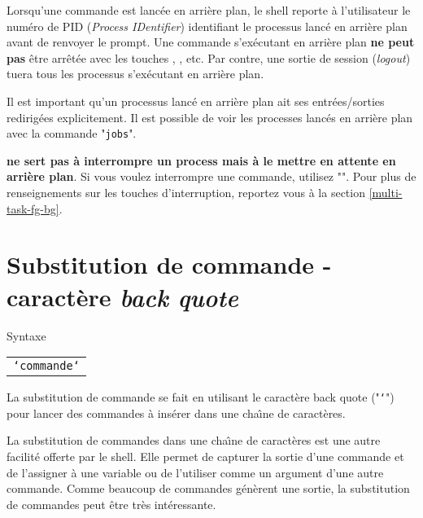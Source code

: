 Lorsqu'une commande est lanc{\'e}e en arri{\`e}re plan, le shell reporte
{\`a} l'utilisateur le num{\'e}ro de PID ({\sl Process IDentifier}) identifiant le processus
lanc{\'e} en arri{\`e}re plan avant de renvoyer le prompt. Une commande
s'ex{\'e}cutant en arri{\`e}re plan \textbf{ne peut pas} {\^e}tre
arr{\^e}t{\'e}e avec les touches , , etc.
Par contre, une sortie de session (\textsl{logout}) tuera tous les
processus s'ex{\'e}cutant en arri{\`e}re plan.

Il est important qu'un processus lanc{\'e} en arri{\`e}re plan ait ses
entr{\'e}es/sorties redirig{\'e}es explicitement. Il est possible de
voir les processes lanc{\'e}s en arri{\`e}re plan avec la commande
 "\texttt{jobs}".

\begin{remarque}
 {\bf ne sert pas {\`a} interrompre un process mais {\`a} le mettre
en attente en arri{\`e}re plan}. Si vous voulez interrompre une commande,
utilisez "". Pour plus de renseignements sur les touches
d'interruption, reportez vous {\`a} la section \ref{multi-task-fg-bg}.
\end{remarque}

\section{\label{multi-task-backq}Substitution de commande - caract{\`e}re {\sl back quote}}

\begin{definition}{Syntaxe}
\begin{tabular}{@{\hspace{1cm}}l}
	{\tt `commande`}\\[0.2cm]
\end{tabular}
\end{definition}

La substitution de commande se fait en utilisant le caract{\`e}re back quote
("\texttt{`}") pour lancer des commandes {\`a} ins{\'e}rer dans une cha{\^\i}ne de
caract{\`e}res.

La substitution de commandes dans une cha{\^\i}ne de caract{\`e}res est une autre
facilit{\'e} offerte par le shell. Elle permet de capturer la sortie d'une
commande et de l'assigner {\`a} une variable ou de l'utiliser comme un
argument d'une autre commande. Comme beaucoup de commandes {\Unix}
g{\'e}n{\`e}rent une sortie, la substitution de commandes peut {\^e}tre tr{\`e}s
int{\'e}ressante.

